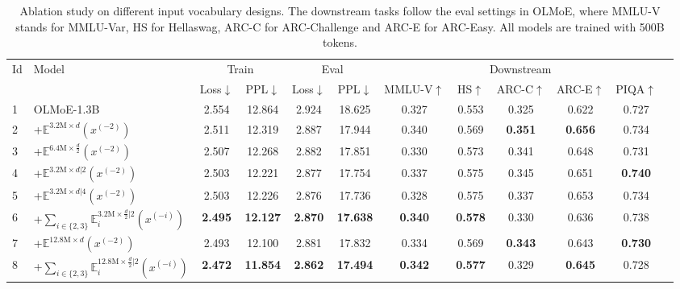 \begin{table}[h!]
\centering
\renewcommand{\arraystretch}{1.3}
\setlength{\tabcolsep}{3.5pt}
\caption{Ablation study on different input vocabulary designs. The downstream tasks follow the eval settings in OLMoE, where MMLU-V stands for MMLU-Var, HS for Hellaswag, ARC-C for ARC-Challenge and ARC-E for ARC-Easy. All models are trained with 500B tokens.}
\label{tab:over_enc_good_exps}
\begin{tabular}{@{}llcccccccccc@{}}
\toprule
\multirow{2}{*}{Id} & \multirow{2}{*}{Model} & \multicolumn{2}{c}{Train} & \multicolumn{2}{c}{Eval} & \multicolumn{5}{c}{Downstream} \\ 
\cmidrule(lr){3-4} \cmidrule(lr){5-6} \cmidrule(lr){7-11}
& & Loss$\downarrow$ & PPL$\downarrow$ & Loss$\downarrow$ & PPL$\downarrow$ & MMLU-V$\uparrow$ & HS$\uparrow$ & ARC-C$\uparrow$ & ARC-E$\uparrow$ & PIQA$\uparrow$ \\ 
\midrule
1 & OLMoE-1.3B & 2.554 & 12.864 & 2.924 & 18.625 & 0.327 & 0.553 & 0.325 & 0.622 & 0.727 \\ 
2 & +$\mathbb{E}^{3.2\mathrm{M}\times d}(x^{(-2)})$ & 2.511 & 12.319 & 2.887 & 17.944 & 0.340 & 0.569 & \textbf{0.351} & \textbf{0.656} & 0.734 \\ 
3 & +$\mathbb{E}^{6.4\mathrm{M}\times \frac{d}{2}}(x^{(-2)})$ &2.507 & 12.268 & 2.882 & 17.851 & 0.330 & 0.573 & 0.341 & 0.648 & 0.731 \\ 
4 & +$\mathbb{E}^{3.2\mathrm{M}\times d|2}(x^{(-2)})$ & 2.503 & 12.221 & 2.877 & 17.754 & 0.337 & 0.575 & 0.345 & 0.651 & \textbf{0.740} \\ 
5 & +$\mathbb{E}^{3.2\mathrm{M}\times d|4}(x^{(-2)})$ & 2.503 & 12.226 & 2.876 & 17.736 & 0.328 & 0.575 & 0.337 & 0.653 & 0.734 \\ 
6 & +$\sum_{i\in\{2,3\}}\mathbb{E}_i^{3.2\mathrm{M}\times \frac{d}{2}|2}(x^{(-i)})$ &\textbf{2.495} & \textbf{12.127} & \textbf{2.870} & \textbf{17.638} & \textbf{0.340} & \textbf{0.578} & 0.330 & 0.636 & 0.738 \\  
\hline 
7 & +$\mathbb{E}^{12.8\mathrm{M}\times d}(x^{(-2)})$ & 2.493 & 12.100 & 2.881 & 17.832 & 0.334 & 0.569 & \textbf{0.343} & 0.643 & \textbf{0.730} \\ 
8 & +$\sum_{i\in\{2,3\}}\mathbb{E}_i^{12.8\mathrm{M}\times \frac{d}{2}|2}(x^{(-i)})$ & \textbf{2.472} & \textbf{11.854} & \textbf{2.862} & \textbf{17.494} & \textbf{0.342} & \textbf{0.577} & 0.329 & \textbf{0.645} & 0.728  \\ 
\bottomrule
\end{tabular}
\end{table}


